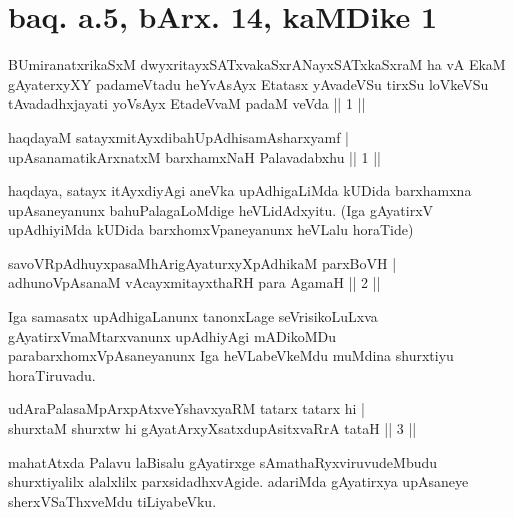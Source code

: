 \section*{baq. a.5, bArx. 14, kaMDike 1}

\begin{shl}
BUmiranatxrikaSxM dwyxritayxSATxvakaSxrANayxSATxkaSxraM ha vA EkaM gAyaterxyXY padameVtadu heYvAsAyx Etatasx yAvadeVSu tirxSu loVkeVSu tAvadadhxjayati yoV\s sAyx EtadeVvaM padaM veVda || 1 ||
\end{shl}


\begin{shl}
haqdayaM satayxmitAyxdibahUpAdhisamAsharxyamf | \\
upAsanamatikArxnatxM barxhamxNaH Palavadabxhu \hfill ||  1 || 
\end{shl}

\begin{artha}
haqdaya, satayx itAyxdiyAgi aneVka upAdhigaLiMda kUDida barxhamxna 
upAsaneyanunx bahuPalagaLoMdige heVLidAdxyitu. (Iga gAyatirxV 
upAdhiyiMda kUDida barxhomxVpaneyanunx heVLalu horaTide)
\end{artha}

\begin{shl}
savoVRpAdhuyxpasaMhArigAyaturxyXpAdhikaM parxBoVH  | \\
adhunoVpAsanaM vAcayxmitayxthaRH para AgamaH \hfill ||  2 || 
\end{shl}

\begin{artha}
Iga samasatx upAdhigaLanunx tanonxLage seVrisikoLuLxva 
gAyatirxVmaMtarxvanunx upAdhiyAgi mADikoMDu parabarxhomxVpAsaneyanunx 
Iga heVLabeVkeMdu muMdina shurxtiyu horaTiruvadu.
\end{artha}


\begin{shl}
udAraPalasaMpArxpAtxveYshavxyaRM tatarx tatarx hi   | \\
shurxtaM shurxtw hi gAyatArxyXsatxdupAsitxvaRrA tataH \hfill ||  3 || 
\end{shl}

\begin{artha} 
mahatAtxda Palavu laBisalu gAyatirxge sAmathaRyxviruvudeMbudu 
shurxtiyalilx alalxlilx parxsidadhxvAgide. adariMda gAyatirxya 
upAsaneye sherxVSaThxveMdu tiLiyabeVku.
\end{artha}

